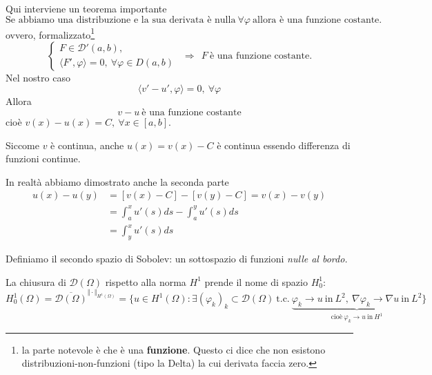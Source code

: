 \documentclass[10pt,a4paper,twoside,openright]{book}
\begin{document}
\begin{dimostrazione}
Qui interviene un teorema importante
\begin{equation*}
	\boxed{\text{Se abbiamo una distribuzione e la sua derivata è nulla} \ \forall \varphi \ \text{allora è una funzione costante.}}
\end{equation*}
ovvero, formalizzato\footnote{la parte notevole è che è una \textbf{funzione}. Questo ci dice che non esistono distribuzioni-non-funzioni (tipo la Delta) la cui derivata faccia zero.}
\begin{equation*}
	\boxed{\begin{cases}
		F\in \mathcal{D} '( a,b) ,\\
		\langle F',\varphi \rangle =0,\ \forall \varphi \in D( a,b)
		\end{cases} \ \ \Rightarrow \ \ F\ \text{è una funzione costante.}}
\end{equation*}
Nel nostro caso
\begin{equation*}
	\langle v'-u',\varphi \rangle =0,\ \forall \varphi 
\end{equation*}
Allora
\begin{equation*}
	v-u\ \text{è una funzione costante}
\end{equation*}
cioè $v( x) -u( x) =C,\ \forall x\in [ a,b]$.

Siccome $v$ è continua, anche $u( x) =v( x) -C$ è continua essendo differenza di funzioni continue.

In realtà abbiamo dimostrato anche la seconda parte
\begin{align*}
	u( x) -u( y) & =[ v( x) -C] -[ v( y) -C] =v( x) -v( y)          \\
	             & =\int ^{x}_{a} u'( s) ds-\int ^{y}_{a} u'( s) ds \\
	             & =\int ^{x}_{y} u'( s) ds                         
\end{align*}
\end{dimostrazione}
Definiamo il secondo spazio di Sobolev: un sottospazio di funzioni \textit{nulle al bordo.}
\begin{definition}
	La chiusura di $\mathcal{D}( \Omega )$ rispetto alla norma $H^{1}$ prende il nome di spazio $H^{1}_{0}$:
	\begin{equation*}
		H^{1}_{0}( \Omega ) =\overline{\mathcal{D}( \Omega )}^{\Vert \cdotp \Vert _{H^{1}( \Omega )}}                                                                                                                                                                                                                             
		                    =\bigg\{u\in H^{1}( \Omega ) :\exists ( \varphi _{k})_{k} \subset \mathcal{D}( \Omega ) \ \text{t.c.} \ \underbrace{\varphi _{k}\rightarrow u\ \text{in} \ L^{2} ,\ \nabla \varphi _{k}\rightarrow \nabla u\ \text{in} \ L^{2}}_{\text{cioè} \ \varphi _{k}\rightarrow u\ \text{in} \ H^{1}}\bigg\} 
	\end{equation*}
\end{definition}
\end{document}
